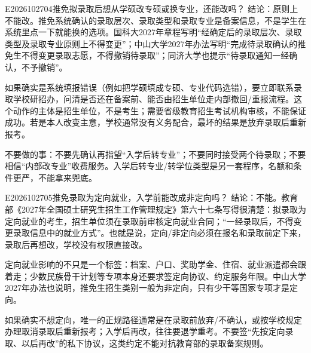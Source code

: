 \begin{qa}{E2026102704}{推免拟录取后想从学硕改专硕或换专业，还能改吗？}
结论：原则上不能改。推免系统确认的录取层次、录取类型和录取专业是备案信息，不是学生在系统里点一下就能换的选项。国科大2027年章程写明“经确定后的录取层次、录取类型及录取专业原则上不得变更”；中山大学2027年办法写明“完成待录取确认的推免生不得变更录取志愿，不得撤销待录取”；同济大学也提示“待录取通知一经确认，不予撤销”。

如果确实是系统填报错误（例如把学硕填成专硕、专业代码选错），要立即联系录取学校研招办，问清是否还在备案前、能否由招生单位走内部撤回/重报流程。这个动作的主体是招生单位，不是考生；需要省级教育招生考试机构审核，不能保证成功。若是本人改变主意，学校通常没有义务配合，最坏的结果是放弃录取后重新报考。

不要做的事：不要先确认再指望“入学后转专业”；不要同时接受两个待录取；不要相信“内部改专业”收费服务。入学后转专业/转学位类型是另一套程序，名额和条件更严，不能拿来兜底。
\end{qa}


\begin{qa}{E2026102705}{推免录取为定向就业，入学前能改成非定向吗？}
结论：不能。教育部《2027年全国硕士研究生招生工作管理规定》第六十七条写得很清楚：拟录取为定向就业的考生，招生单位须在录取前审核定向就业合同；“一经录取后，不得变更录取信息中的就业方式”。也就是说，定向/非定向必须在报名和录取前定下来，录取后再想改，学校没有权限直接改。

定向就业影响的不只是一个标签：档案、户口、奖助学金、住宿、就业派遣都会跟着走；少数民族骨干计划等专项本身还要求签定向协议、约定服务年限。中山大学2027年办法也说明，推免生招生类别一般为非定向，只有少干等国家专项才是定向。

如果确实不想定向，唯一的正规路径通常是在录取前放弃/不确认，或按学校规定办理取消录取后重新报考；入学后再改，往往要退学重考。不要签“先按定向录取、以后再改”的私下协议，这类约定不能对抗教育部的录取备案规则。
\end{qa}


